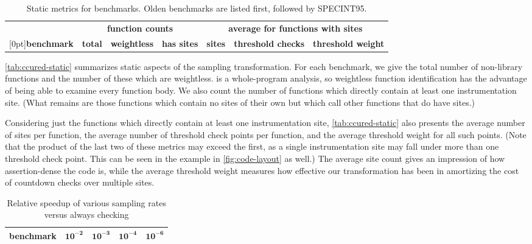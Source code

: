 \begin{table*}[tb]
  \centering
  \begin{tabular}{|l|rrr|rrr|}
    \hline
    & \multicolumn{3}{c|}{\textbf{function counts}} & \multicolumn{3}{c|}{\textbf{average for functions with sites}} \\
    \raisebox{1.5ex}[0pt]{\textbf{benchmark}} & \textbf{total} & \textbf{weightless} & \textbf{has sites} & \textbf{sites} & \textbf{threshold checks} & \textbf{threshold weight} \\
    \hline\hline
    
    \hline
    
    \hline
  \end{tabular}
  \caption{Static metrics for \CCured benchmarks.  Olden benchmarks
    are listed first, followed by SPECINT95.}
  \label{tab:ccured-static}
\end{table*}

\autoref{tab:ccured-static} summarizes static aspects of the sampling
transformation.  For each benchmark, we give the total number of
non-library functions and the number of these which are weightless.
\CCured is a whole-program analysis, so weightless function
identification has the advantage of being able to examine every
function body.  We also count the number of functions which directly
contain at least one instrumentation site.  (What remains are those
functions which contain no sites of their own but which call other
functions that do have sites.)

Considering just the functions which directly contain at least one
instrumentation site, \autoref{tab:ccured-static} also presents the
average number of sites per function, the average number of threshold
check points per function, and the average threshold weight for all
such points.  (Note that the product of the last two of these metrics
may exceed the first, as a single instrumentation site may fall under
more than one threshold check point.  This can be seen in the example
in \autoref{fig:code-layout} as well.)  The average site count gives
an impression of how assertion-dense the code is, while the average
threshold weight measures how effective our transformation has been in
amortizing the cost of countdown checks over multiple sites.

\begin{table}
  \centering
  \begin{tabular}{|l|rrrr|}
    \hline
    \rule{0pt}{2.5ex}
    \textbf{benchmark} & $\mathbf{10^{-2}}$ & $\mathbf{10^{-3}}$ & $\mathbf{10^{-4}}$ & $\mathbf{10^{-6}}$ \\
    \hline\hline
    
    \hline
    
    \hline
  \end{tabular}
  \caption{Relative speedup of various sampling rates versus always checking}
  \label{tab:ccured-density}
\end{table}

